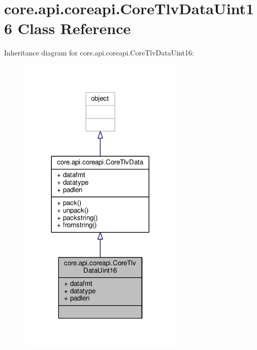 \hypertarget{classcore_1_1api_1_1coreapi_1_1_core_tlv_data_uint16}{\section{core.\+api.\+coreapi.\+Core\+Tlv\+Data\+Uint16 Class Reference}
\label{classcore_1_1api_1_1coreapi_1_1_core_tlv_data_uint16}
}


Inheritance diagram for core.\+api.\+coreapi.\+Core\+Tlv\+Data\+Uint16\+:
\nopagebreak
\begin{figure}[H]
\begin{center}
\leavevmode
\includegraphics[width=224pt]{classcore_1_1api_1_1coreapi_1_1_core_tlv_data_uint16__inherit__graph}
\end{center}
\end{figure}



